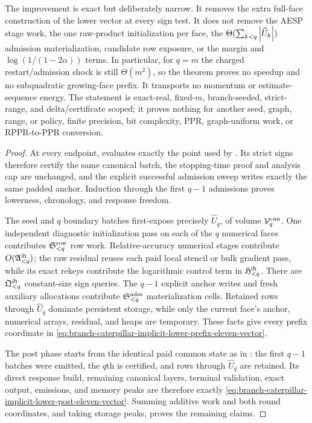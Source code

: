 \begin{theorem}
The improvement is exact but deliberately narrow.  It removes the extra
full-face construction of the lower vector at every sign test.  It does not
remove the AESP stage work, the one raw-product initialization per face, the
$\Theta(\sum_{k<q}\left\lvert \widehat U_k \right\rvert)$ admission materialization, candidate
row exposure, or the margin and $\log(1/(1-2\alpha))$ terms.  In particular,
for $q=m$ the charged restart/admission shock is still $\Theta(m^2)$, so the
theorem proves no speedup and no subquadratic growing-face prefix.  It
transports no momentum or estimate-sequence energy.  The statement is
exact-real, fixed-$m$, branch-seeded, strict-range, and delta/certificate
scoped; it proves nothing for another seed, graph, range, or policy,
finite precision, bit complexity, PPR, graph-uniform work, or RPPR-to-PPR
conversion.
\end{theorem}

\begin{proof}
At every endpoint,
 evaluates exactly the point
used by
.  Its strict signs
therefore certify the same canonical batch, the stopping-time proof and
analysis cap are unchanged, and the explicit successful admission sweep
writes exactly the same padded anchor.  Induction through the first $q-1$
admissions proves lowerness, chronology, and response freedom.

The seed and $q$ boundary batches first-expose precisely
$\widehat U_q$, of volume $\mathcal V_q^{\rm can}$.  One independent
diagnostic initialization pass on each of the $q$ numerical faces contributes
$\mathfrak S_{<q}^{\rm row}$ row work.  Relative-accuracy numerical stages
contribute $O(\mathfrak A_{<q}^{\rm ih})$; the raw residual reuses each paid
local stencil or bulk gradient pass, while its exact rekeys contribute the
logarithmic control term in $\mathfrak H_{<q}^{\rm ih}$.  There are
$\mathfrak Q_{<q}^{\rm ih}$ constant-size sign queries.  The $q-1$ explicit
anchor writes and fresh auxiliary allocations contribute
$\mathfrak S_{<q}^{\rm adm}$ materialization cells.  Retained rows through
$\widehat U_q$ dominate persistent storage, while only the current face's
anchor, numerical arrays, residual, and heaps are temporary.  These facts
give every prefix coordinate in
\cref{eq:branch-caterpillar-implicit-lower-prefix-eleven-vector}.

The post phase starts from the identical paid common state as in
: the first $q-1$
batches were emitted, the $q$th is certified, and rows through
$\widehat U_q$ are retained.  Its direct response build, remaining canonical
layers, terminal validation, exact output, emissions, and memory peaks are
therefore exactly
\cref{eq:branch-caterpillar-implicit-lower-post-eleven-vector}.  Summing
additive work and both round coordinates, and taking storage peaks, proves
the remaining claims.
\end{proof}
